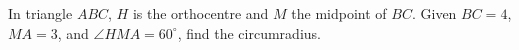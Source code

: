 In triangle $ABC$, $H$ is the orthocentre and $M$ the midpoint of $BC$. Given $BC=4$, $MA=3$, and $\angle HMA=60^\circ$, find the circumradius.

